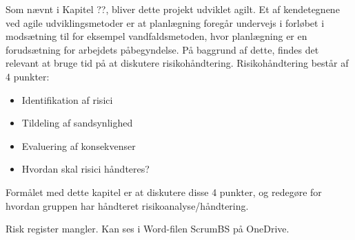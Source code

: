 Som nævnt i Kapitel ??, bliver dette projekt udviklet agilt. Et af kendetegnene ved agile udviklingsmetoder er at 
planlægning foregår undervejs i forløbet i modsætning til for eksempel vandfaldsmetoden, hvor planlægning er en 
forudsætning for arbejdets påbegyndelse. På baggrund af dette, findes det relevant at bruge tid på at diskutere 
risikohåndtering. Risikohåndtering består af 4 punkter:

\begin{itemize}
    \item Identifikation af risici
    \item Tildeling af sandsynlighed
    \item Evaluering af konsekvenser
    \item Hvordan skal risici håndteres?
\end{itemize}

Formålet med dette kapitel er at diskutere disse 4 punkter, og redegøre for hvordan gruppen har håndteret risikoanalyse/håndtering.

Risk register mangler. Kan ses i Word-filen ScrumBS på OneDrive.